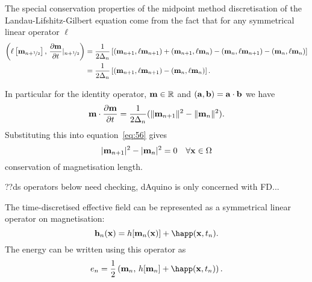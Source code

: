 The special conservation properties of the midpoint method discretisation of the Landau-Lifshitz-Gilbert equation come from the fact that for any symmetrical linear operator $\ell$
\begin{align}
  \label{eq:54}
  \left(\ell \left[ \mathbf{m}_{n+\nicefrac{1}{2}} \right],\,  \frac{\partial \mathbf{m}}{\partial t} \lvert_{n+\nicefrac{1}{2}} \right)
  &= \frac{1}{2\Delta_{n}} \left[
    (\mathbf{m}_{n+1} , \ell \mathbf{m}_{n+1})
    + (\mathbf{m}_{n+1} , \ell \mathbf{m}_{n})
    - (\mathbf{m}_{n} , \ell \mathbf{m}_{n+1})
    - (\mathbf{m}_{n} , \ell \mathbf{m}_{n})
    \right] \notag\\
  &= \frac{1}{2\Delta_{n}} \left[
    (\mathbf{m}_{n+1} , \ell \mathbf{m}_{n+1})
    - (\mathbf{m}_{n} , \ell \mathbf{m}_{n})
    \right].
\end{align}

In particular for the identity operator, $\mathbf{m} \in \mathbb{R}$ and $({\mathbf{a}}, {\mathbf{b}}) = {\mathbf{a}} \cdot {\mathbf{b}}$ we have
\begin{equation}
  \label{eq:52}
  \mathbf{m} \cdot \frac{\partial \mathbf{m}}{\partial t}  = \frac{1}{2\Delta_{n}} (\lVert \mathbf{m}_{n+1} \rVert^2 - \lVert \mathbf{m}_{n} \rVert^2 ).
\end{equation}
Substituting this into equation~\eqref{eq:56} gives
\begin{equation}
  \lvert \mathbf{m}_{n+1}  \rvert^2 - \lvert \mathbf{m}_{n} \rvert^2 = 0 \quad \forall \mathbf{x} \in \Omega
\end{equation}
\ie conservation of magnetisation length.

??ds operators below need checking, dAquino is only concerned with FD...

The time-discretised effective field can be represented as a symmetrical linear operator on magnetisation:\cite{DAquino2005}
\begin{equation}
  \label{eq:hop}
  \hv_n(\xv) = \hop [\mv_n(\xv)] + \happ(\xv, t_n).
\end{equation}
The energy can be written using this operator as
\begin{equation}
  \label{eq:energy-hop}
  \e_n = \frac{1}{2} \ip{\mv_n}{\hop[\mv_n] + \happ(\xv,t_n)}.
\end{equation}

